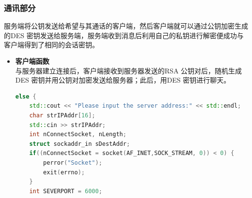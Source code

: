 \documentclass[UTF8,a4paper,10pt]{ctexart}
\begin{document}
\subsubsection{通讯部分}
服务端将公钥发送给希望与其通话的客户端，然后客户端就可以通过公钥加密生成的DES 密钥发送给服务端，服务端收到消息后利用自己的私钥进行解密便成功与客户端得到了相同的会话密钥。
\begin{itemize}
  \item \textbf{客户端函数}\\ 
  与服务器建立连接后，客户端接收到服务器发送的RSA 公钥对后，随机生成DES 密钥并用公钥对加密发送给服务器；此后，用DES 密钥进行聊天。
  \begin{lstlisting}[language = C++]
else {
    std::cout << "Please input the server address:" << std::endl;
    char strIPAddr[16];
    std::cin >> strIPAddr;
    int nConnectSocket, nLength;
    struct sockaddr_in sDestAddr;
    if((nConnectSocket = socket(AF_INET,SOCK_STREAM, 0)) < 0) {
        perror("Socket");
        exit(errno);
    }
    int SEVERPORT = 6000;


\end{lstlisting}
\end{itemize}
\end{document}
